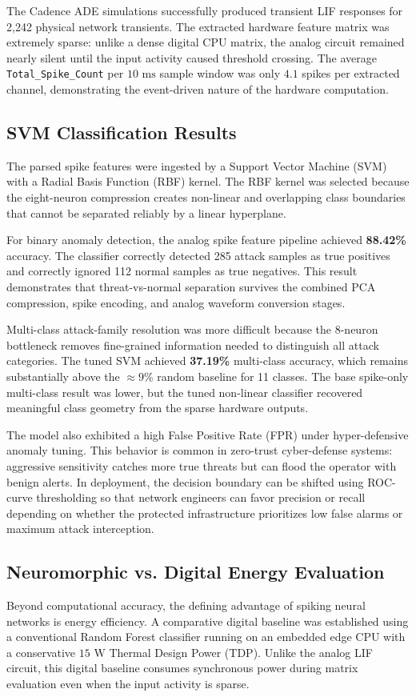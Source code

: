 \documentclass{ieeeaccess}
\begin{document}
The Cadence ADE simulations successfully produced transient LIF responses for 2,242 physical network transients. The extracted hardware feature matrix was extremely sparse: unlike a dense digital CPU matrix, the analog circuit remained nearly silent until the input activity caused threshold crossing. The average \texttt{Total\_Spike\_Count} per $10\text{ ms}$ sample window was only $4.1$ spikes per extracted channel, demonstrating the event-driven nature of the hardware computation.

\subsection{SVM Classification Results}
The parsed spike features were ingested by a Support Vector Machine (SVM) with a Radial Basis Function (RBF) kernel. The RBF kernel was selected because the eight-neuron compression creates non-linear and overlapping class boundaries that cannot be separated reliably by a linear hyperplane.

For binary anomaly detection, the analog spike feature pipeline achieved \textbf{88.42\%} accuracy. The classifier correctly detected 285 attack samples as true positives and correctly ignored 112 normal samples as true negatives. This result demonstrates that threat-vs-normal separation survives the combined PCA compression, spike encoding, and analog waveform conversion stages.

Multi-class attack-family resolution was more difficult because the 8-neuron bottleneck removes fine-grained information needed to distinguish all attack categories. The tuned SVM achieved \textbf{37.19\%} multi-class accuracy, which remains substantially above the $\approx 9\%$ random baseline for 11 classes. The base spike-only multi-class result was lower, but the tuned non-linear classifier recovered meaningful class geometry from the sparse hardware outputs.

The model also exhibited a high False Positive Rate (FPR) under hyper-defensive anomaly tuning. This behavior is common in zero-trust cyber-defense systems: aggressive sensitivity catches more true threats but can flood the operator with benign alerts. In deployment, the decision boundary can be shifted using ROC-curve thresholding so that network engineers can favor precision or recall depending on whether the protected infrastructure prioritizes low false alarms or maximum attack interception.

\subsection{Neuromorphic vs. Digital Energy Evaluation}
Beyond computational accuracy, the defining advantage of spiking neural networks is energy efficiency. A comparative digital baseline was established using a conventional Random Forest classifier running on an embedded edge CPU with a conservative $15\text{ W}$ Thermal Design Power (TDP). Unlike the analog LIF circuit, this digital baseline consumes synchronous power during matrix evaluation even when the input activity is sparse.
\end{document}
